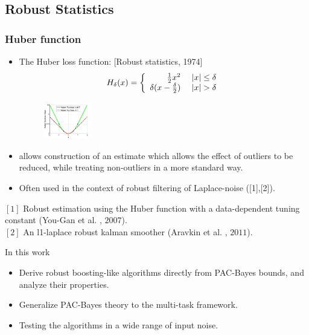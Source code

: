 \documentclass[mathserif]{beamer}
\begin{document}
\subsection{Robust Statistics}
\begin{frame}
\frametitle{ Huber function }
\begin{itemize}
\item The Huber loss function: [Robust statistics, 1974]
\begin{align*}
 H_{\delta}(x) = \left\{ \begin{array}{rl}
 \frac{1}{2} x^2 &\mbox{  $\left\vert{x}\right\vert\leq\delta$} \\
  \delta(x-\frac{\delta}{2}) &\mbox{ $\left\vert{x}\right\vert>\delta$}
       \end{array} \right.
 \end{align*}
 \begin{figure}
  \begin{center}
    \includegraphics[width=0.2\textwidth]{figs/huber_loss}
  \end{center}
\end{figure}
\item allows construction of an estimate which allows the effect of outliers to be reduced, while treating non-outliers in a more standard way.
\item Often used in the context of robust filtering of Laplace-noise ([1],[2]).
\end{itemize}
$[1]$ Robust estimation using the Huber function with a
data-dependent tuning constant (You-Gan et al. , $2007$).\\
$[2]$ An l1-laplace robust kalman smoother (Aravkin et al. , $2011$). \\
\begin{block}{In this work}
\begin{itemize}
\item Derive robust boosting-like algorithms directly from PAC-Bayes bounds, and analyze their properties.
\item Generalize PAC-Bayes theory to the multi-task framework.
\item Testing the algorithms in a wide range of input noise.
\end{itemize}
\end{block}
\end{frame}
\end{document}
